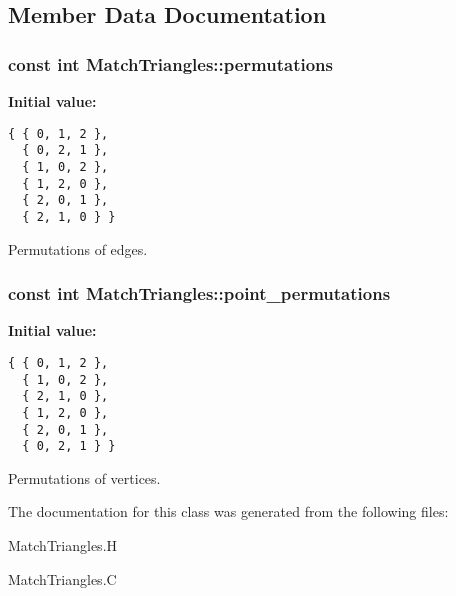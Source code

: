 \subsection{Member Data Documentation}
\subsubsection{\setlength{\rightskip}{0pt plus 5cm}const int \bf{Match\-Triangles::permutations}\hspace{0.3cm}{\tt  [static, private]}}\label{classASCbase_1_1MatchTriangles_ef9e8c25707ff5d109fc2f93d00be198}


\textbf{Initial value:}

\begin{Code}\begin{verbatim} 
{ { 0, 1, 2 },
  { 0, 2, 1 },
  { 1, 0, 2 },
  { 1, 2, 0 },
  { 2, 0, 1 },
  { 2, 1, 0 } }
\end{verbatim}\end{Code}
Permutations of edges. 

\subsubsection{\setlength{\rightskip}{0pt plus 5cm}const int \bf{Match\-Triangles::point\_\-permutations}\hspace{0.3cm}{\tt  [static, private]}}\label{classASCbase_1_1MatchTriangles_5249b60afc22af79841be9345cf6c98e}


\textbf{Initial value:}

\begin{Code}\begin{verbatim} 
{ { 0, 1, 2 },
  { 1, 0, 2 },
  { 2, 1, 0 },
  { 1, 2, 0 },
  { 2, 0, 1 },
  { 0, 2, 1 } }
\end{verbatim}\end{Code}
Permutations of vertices. 



The documentation for this class was generated from the following files:\begin{CompactItemize}
\item 
Match\-Triangles.H\item 
Match\-Triangles.C\end{CompactItemize}
